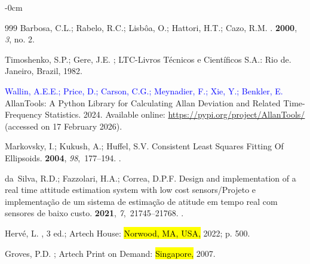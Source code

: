 \documentclass[sensors,article,accept,pdftex,moreauthors]{Definitions/mdpi}
\begin{document}
\begin{adjustwidth}{-\extralength}{0cm}
\begin{thebibliography}{999}
Barbosa, C.L.; Rabelo, R.C.; Lisb{\^o}a, O.; Hattori, H.T.; Cazo, R.M.
.
 {\bf 2000}, {\em 3}, no. 2.%


Timoshenko, S.P.; Gere, J.E.
; LTC-Livros Técnicos e Científicos S.A.: Rio de. Janeiro,  Brazil, 1982.

\textcolor{blue}{Wallin, A.E.E.; Price, D.; Carson, C.G.; Meynadier, F.; Xie, Y.; Benkler, E.} %
\newblock AllanTools: A Python Library for Calculating Allan Deviation and Related Time-Frequency Statistics. 2024.
\newblock  Available online: \url{https://pypi.org/project/AllanTools/}  (accessed on 17 February 2026).


Markovsky, I.; Kukush, A.; Huffel, S.V.
\newblock Consistent Least Squares Fitting Of Ellipsoids.
 {\bf 2004}, {\em 98},~177--194.
.

da~Silva, R.D.; Fazzolari, H.A.; Correa, D.P.F.
\newblock Design and implementation of a real time attitude estimation system with low cost sensors/Projeto e implementa{\c{c}}{\~{a}}o de um sistema de estima{\c{c}}{\~{a}}o de atitude em tempo real com sensores de baixo custo.
 {\bf 2021}, {\em 7},~21745--21768.
.

{Hervé, L}.
, 3 ed.; Artech House: \hl{Norwood, MA, USA,}  2022; p. 500.

Groves, P.D.
; Artech Print on Demand: \hl{Singapore,}  2007.


\end{thebibliography}
\end{adjustwidth}
\end{document}
